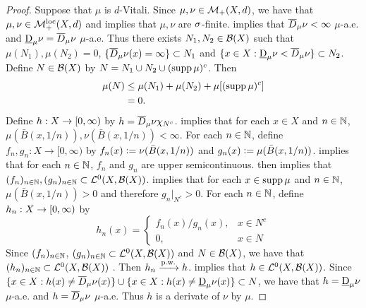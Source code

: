 \documentclass{book}
\begin{document}
	\begin{proof}
		 
		Suppose that $\mu$ is $d$-Vitali. 
		Since $\mu, \nu \in \mathcal{M}_+(X,d)$, we have that $\mu, \nu \in \mathcal{M}_+^{\text{loc}}(X,d)$ and  implies that $\mu, \nu$ are $\sigma$-finite.  implies that $\overline{D}_{\mu}\nu < \infty$ $\mu$-a.e. and $\underbar{D}_{\mu}\nu = \overline{D}_{\mu}\nu$ $\mu$-a.e. Thus there exists $N_1,N_2 \in \mathcal{B}(X)$ such that $\mu(N_1),\mu(N_2) = 0$, $\{\overline{D}_{\mu}\nu(x) = \infty\} \subset N_1$ and $\{x \in X: \underbar{D}_{\mu}\nu < \overline{D}_{\mu}\nu\} \subset N_2$. Define $N \in \mathcal{B}(X)$ by $N = N_1 \cup N_2 \cup( \operatorname{supp} \mu)^c$. Then 
		\begin{align*}
			\mu(N)
			& \leq \mu(N_1) + \mu(N_2) + \mu[(\operatorname{supp} \mu)^c] \\
			& = 0.
		\end{align*}
		Define $h:X \rightarrow [0,\infty)$ by $h = \overline{D}_{\mu} \nu \chi_{N^c}$.  implies that for each $x \in X$ and $n \in \mathbb{N}$, $\mu(\bar{B}(x, 1/n)), \nu(\bar{B}(x, 1/n)) < \infty$.   
		For each $n \in \mathbb{N}$, define $f_n, g_n: X \rightarrow [0, \infty)$ by $f_n(x) \vcentcolon= \nu(\bar{B}(x, 1/n))$ and $g_n(x) \vcentcolon= \mu(\bar{B}(x, 1/n))$.  implies that for each $n \in \mathbb{N}$, $f_n$ and $g_n$ are upper semicontinuous.  then implies that $(f_n)_{n \in \mathbb{N}}, (g_n)_{n \in \mathbb{N}} \subset \mathcal{L}^0(X, \mathcal{B}(X))$.  implies that for each $x \in \operatorname{supp} \mu$ and $n \in \mathbb{N}$, $\mu(\bar{B}(x, 1/n)) > 0$ and therefore $g_n|_{N^c} > 0$.
		For each $n \in \mathbb{N}$, define $h_n :X \rightarrow [0,\infty)$ by  
		\[
		h_n(x) = 
		\begin{cases}
			f_n(x)/g_n(x), & x \in N^c \\
			0, & x \in N
		\end{cases}
		\]
		Since $(f_n)_{n \in \mathbb{N}}$, $(g_n)_{n \in \mathbb{N}} \subset \mathcal{L}^0(X, \mathcal{B}(X))$ and $N \in \mathcal{B}(X)$, we have that $(h_n)_{n \in \mathbb{N}} \subset \mathcal{L}^0(X, \mathcal{B}(X))$ . Then $h_n \xrightarrow{\text{p.w.}} h$.  implies that $h \in \mathcal{L}^0(X, \mathcal{B}(X))$. Since $\{x \in X: h(x) \neq \overline{D}_{\mu}\nu(x)\} \cup \{x \in X: h(x) \neq \underbar{D}_{\mu}\nu(x)\} \subset N$, we have that $h = \underbar{D}_{\mu}\nu$ $\mu$-a.e. and $h = \overline{D}_{\mu}\nu$ $\mu$-a.e. Thus $h$ is a derivate of $\nu$ by $\mu$.
	\end{proof}
\end{document}
